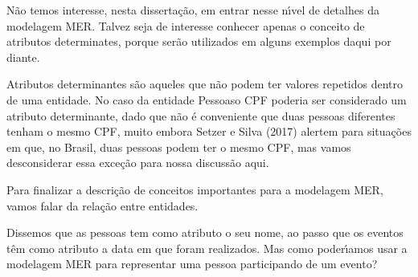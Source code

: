 \documentclass[
12pt,		%
openright,	%
twoside,  %
a4paper,			%
chapter=TITLE,		%
english,			%
french,				%
spanish,			%
brazil				%
]{USPSC-classe/USPSC}
\begin{document}
N\~ao temos interesse, nesta disserta\c{c}\~ao, em entrar nesse n\'{\i}vel de detalhes da modelagem MER. Talvez seja de interesse conhecer apenas o conceito de \textquotedbl atributos determinates\textquotedbl , porque ser\~ao utilizados em alguns exemplos daqui por diante.














Atributos determinantes s\~ao aqueles que n\~ao podem ter valores repetidos dentro de uma entidade. No caso da entidade \textquotedbl Pessoas\textquotedbl  o CPF poderia ser considerado um atributo determinante, dado que n\~ao \'e conveniente que duas pessoas diferentes tenham o mesmo CPF, muito embora  Setzer e Silva (2017) alertem para situa\c{c}\~oes em que, no Brasil, duas pessoas podem ter o mesmo CPF, mas vamos desconsiderar essa exce\c{c}\~ao para nossa discuss\~ao aqui.














Para finalizar a descri\c{c}\~ao de conceitos importantes para a modelagem MER, vamos falar da rela\c{c}\~ao entre entidades.














Dissemos que as pessoas tem como atributo o seu nome, ao passo que os eventos t\^em como atributo a data em que foram realizados. Mas como poder\'{\i}amos usar a modelagem MER para representar uma pessoa participando de um evento?
\end{document}
